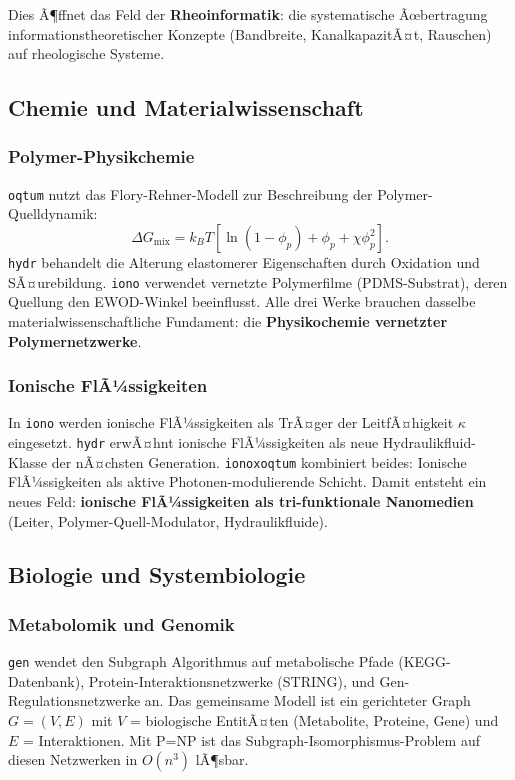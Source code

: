 ﻿\documentclass[a4paper,12pt]{scrreprt}
\theoremstyle{definition}
\begin{document}
Dies Ã¶ffnet das Feld der \textbf{Rheoinformatik}: die systematische Ãœbertragung
informationstheoretischer Konzepte (Bandbreite, KanalkapazitÃ¤t, Rauschen)
auf rheologische Systeme.

\subsection{Chemie und Materialwissenschaft}

\subsubsection{Polymer-Physikchemie}

\texttt{oqtum} nutzt das Flory-Rehner-Modell zur Beschreibung der
Polymer-Quell\-dynamik:
\[
  \Delta G_{\text{mix}} = k_B T \left[
    \ln(1-\phi_p) + \phi_p + \chi \phi_p^2
  \right].
\]
\texttt{hydr} behandelt die Alterung elastomerer Eigenschaften durch Oxidation
und SÃ¤urebildung. \texttt{iono} verwendet vernetzte Polymerfilme (PDMS-Substrat),
deren Quellung den EWOD-Winkel beeinflusst. Alle drei Werke brauchen
dasselbe materialwissenschaftliche Fundament: die \textbf{Physikochemie
vernetzter Polymernetzwerke}.

\subsubsection{Ionische FlÃ¼ssigkeiten}

In \texttt{iono} werden ionische FlÃ¼ssigkeiten als TrÃ¤ger der LeitfÃ¤higkeit
$\kappa$ eingesetzt. \texttt{hydr} erwÃ¤hnt ionische FlÃ¼ssigkeiten als neue
Hydraulikfluid-Klasse der nÃ¤chsten Generation. \texttt{ionoxoqtum}
kombiniert beides: Ionische FlÃ¼ssigkeiten als aktive Photonen-modulierende
Schicht. Damit entsteht ein neues Feld: \textbf{ionische FlÃ¼ssigkeiten als
tri-funktionale Nanomedien} (Leiter, Polymer-Quell-Modulator, Hydraulikfluide).

\subsection{Biologie und Systembiologie}

\subsubsection{Metabolomik und Genomik}

\texttt{gen} wendet den Subgraph Algorithmus auf metabolische Pfade
(KEGG-Datenbank), Protein-Interaktionsnetzwerke (STRING), und
Gen-Regulationsnetzwerke an. Das gemeinsame Modell ist ein gerichteter Graph
$G = (V, E)$ mit $V$ = biologische EntitÃ¤ten (Metabolite, Proteine, Gene)
und $E$ = Interaktionen. Mit P=NP ist das Subgraph-Isomorphismus-Problem
auf diesen Netzwerken in $O(n^3)$ lÃ¶sbar.
\end{document}
